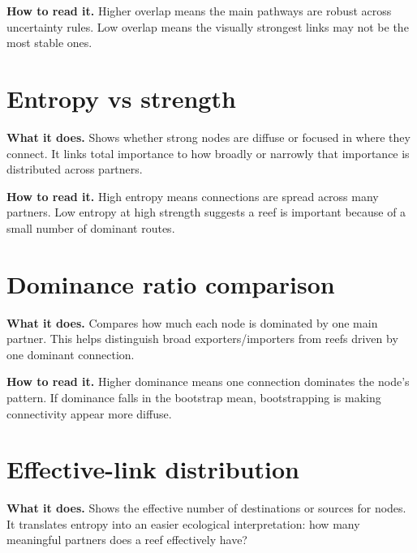\documentclass[11pt,a4paper]{article}
\begin{document}

\textbf{How to read it.} Higher overlap means the main pathways are robust across uncertainty rules.
Low overlap means the visually strongest links may not be the most stable ones.

\section{Entropy vs strength}

\textbf{What it does.} Shows whether strong nodes are diffuse or focused in where they connect.
It links total importance to how broadly or narrowly that importance is distributed across partners.


\textbf{How to read it.} High entropy means connections are spread across many partners.
Low entropy at high strength suggests a reef is important because of a small number of dominant routes.

\section{Dominance ratio comparison}

\textbf{What it does.} Compares how much each node is dominated by one main partner.
This helps distinguish broad exporters/importers from reefs driven by one dominant connection.


\textbf{How to read it.} Higher dominance means one connection dominates the node's pattern.
If dominance falls in the bootstrap mean, bootstrapping is making connectivity appear more diffuse.

\section{Effective-link distribution}

\textbf{What it does.} Shows the effective number of destinations or sources for nodes.
It translates entropy into an easier ecological interpretation: how many meaningful partners does a reef effectively have?

\end{document}
